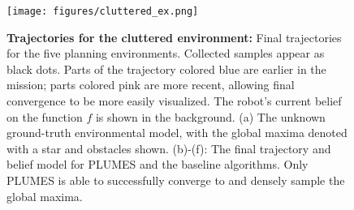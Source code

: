 \documentclass{styles/svproc}
\begin{document}
\begin{figure}[t]
\centering
    \texttt{[image: figures/cluttered\_ex.png]}
    \caption{\textbf{Trajectories for the cluttered environment:} Final trajectories for the five planning environments. Collected samples appear as black dots. Parts of the trajectory colored blue are earlier in the mission; parts colored pink are more recent, allowing final convergence to be more easily visualized. The robot's current belief on the function $f$ is shown in the background.  (a) The unknown ground-truth environmental model, with the global maxima denoted with a star and obstacles shown. (b)-(f): The final trajectory and belief model for PLUMES and the baseline algorithms. Only PLUMES is able to successfully converge to and densely sample the global maxima.}    
    \label{fig:cluttered_ex}
\end{figure}




\end{document}
